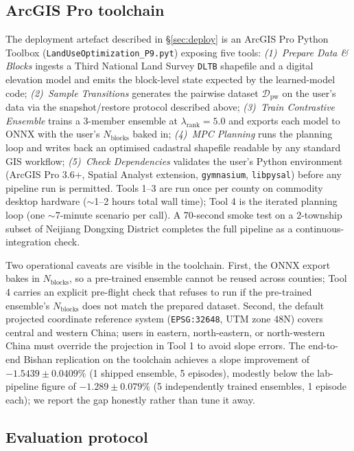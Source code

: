 \documentclass[11pt]{article}
\begin{document}
\subsection*{ArcGIS Pro toolchain}\label{sec:methods-toolchain}

The deployment artefact described in \S\ref{sec:deploy} is an ArcGIS Pro Python Toolbox (\texttt{LandUseOptimization\_P9.pyt}) exposing five tools: \emph{(1)~Prepare Data \& Blocks} ingests a Third National Land Survey \texttt{DLTB} shapefile and a digital elevation model and emits the block-level state expected by the learned-model code; \emph{(2)~Sample Transitions} generates the pairwise dataset $\mathcal{D}_{\text{pw}}$ on the user's data via the snapshot/restore protocol described above; \emph{(3)~Train Contrastive Ensemble} trains a 3-member ensemble at $\lambda_{\text{rank}}{=}5.0$ and exports each model to ONNX with the user's $N_{\text{blocks}}$ baked in; \emph{(4)~MPC Planning} runs the planning loop and writes back an optimised cadastral shapefile readable by any standard GIS workflow; \emph{(5)~Check Dependencies} validates the user's Python environment (ArcGIS Pro 3.6+, Spatial Analyst extension, \texttt{gymnasium}, \texttt{libpysal}) before any pipeline run is permitted. Tools 1--3 are run once per county on commodity desktop hardware ($\sim$1--2 hours total wall time); Tool 4 is the iterated planning loop (one $\sim$7-minute scenario per call). A 70-second smoke test on a 2-township subset of Neijiang Dongxing District completes the full pipeline as a continuous-integration check.

Two operational caveats are visible in the toolchain. First, the ONNX export bakes in $N_{\text{blocks}}$, so a pre-trained ensemble cannot be reused across counties; Tool 4 carries an explicit pre-flight check that refuses to run if the pre-trained ensemble's $N_{\text{blocks}}$ does not match the prepared dataset. Second, the default projected coordinate reference system (\texttt{EPSG:32648}, UTM zone 48N) covers central and western China; users in eastern, north-eastern, or north-western China must override the projection in Tool 1 to avoid slope errors. The end-to-end Bishan replication on the toolchain achieves a slope improvement of $-1.5439 \pm 0.0409\%$ (1 shipped ensemble, 5 episodes), modestly below the lab-pipeline figure of $-1.289 \pm 0.079\%$ (5 independently trained ensembles, 1 episode each); we report the gap honestly rather than tune it away.

\subsection*{Evaluation protocol}
\end{document}
